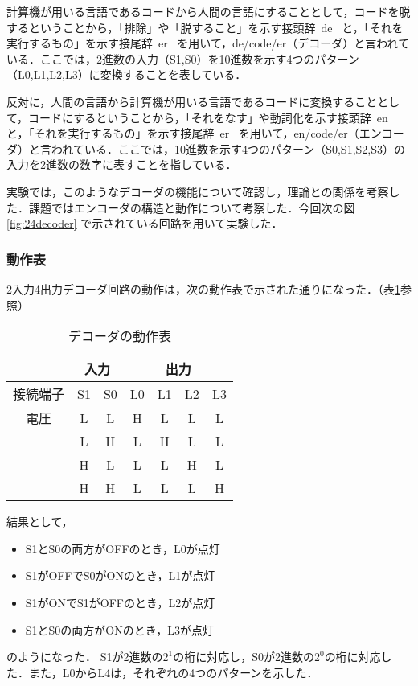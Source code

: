 計算機が用いる言語であるコードから人間の言語にすることとして，コードを脱するということから，「排除」や「脱すること」を示す接頭辞\, de \, と，「それを実行するもの」を示す接尾辞\, er \, を用いて，de/code/er（デコーダ）と言われている．ここでは，2進数の入力（S1,S0）を10進数を示す4つのパターン（L0,L1,L2,L3）に変換することを表している．

反対に，人間の言語から計算機が用いる言語であるコードに変換することとして，コードにするということから，「それをなす」や動詞化を示す接頭辞\, en \, と，「それを実行するもの」を示す接尾辞\, er \, を用いて，en/code/er（エンコーダ）と言われている．ここでは，10進数を示す4つのパターン（S0,S1,S2,S3）の入力を2進数の数字に表すことを指している．

実験では，このようなデコーダの機能について確認し，理論との関係を考察した．課題ではエンコーダの構造と動作について考察した．今回次の図\ref{fig:24decoder} で示されている回路を用いて実験した．

\subsubsection{動作表}
\label{decoderencoder_moment}
2入力4出力デコーダ回路の動作は，次の動作表で示された通りになった．（表\ref{tab:24decoder_momenttab}参照）

\begin {table}[ht]
	\begin {center}
		\caption {デコーダの動作表}%
		\begin {tabular}{c|cc|cccc}\hline
			\multicolumn{1}{c|}{}&%
			\multicolumn{2}{c}{入力}&%
			\multicolumn{4}{|c}{出力}\\ %
			\hline
			\multicolumn{1}{c|}{接続端子}&%
			\multicolumn{1}{c}{S1}&%
			\multicolumn{1}{c}{S0}&%
			\multicolumn{1}{|c}{L0}& %
			\multicolumn{1}{c}{L1}&%
			\multicolumn{1}{c}{L2}&%
			\multicolumn{1}{c}{L3}\\%
			\hline
			電圧&L&L&H&L&L&L\\%
			&L&H&L&H&L&L\\%
			&H&L&L&L&H&L\\%
			&H&H&L&L&L&H\\
			\hline
		\end{tabular}
		\label {tab:24decoder_momenttab}%
	\end{center}
\end{table}


結果として，
\begin{itemize}
	\item S1とS0の両方がOFFのとき，L0が点灯
	\item S1がOFFでS0がONのとき，L1が点灯
	\item S1がONでS1がOFFのとき，L2が点灯
	\item S1とS0の両方がONのとき，L3が点灯
\end{itemize}
のようになった．
S1が2進数の$2^1$の桁に対応し，S0が2進数の$2^0$の桁に対応した．また，L0からL4は，それぞれの4つのパターンを示した．
